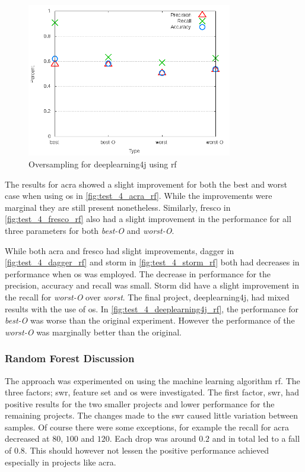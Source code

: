 \begin{figure}[!ht]
    \centering
        \includegraphics[width=0.8\textwidth]{images/rf/test_4/deeplearning4j_sample_range}
    \caption{Oversampling for deeplearning4j using \gls{rf}}
    \label{fig:test_4_deeplearning4j_rf}
\end{figure}

The results for acra showed a slight improvement for both the best and worst case when using \gls{os} in \autoref{fig:test_4_acra_rf}. While the improvements were marginal they are still present nonetheless. Similarly, fresco in \autoref{fig:test_4_fresco_rf} also had a slight improvement in the performance for all three parameters for both \textit{best-O} and \textit{worst-O}.

While both acra and fresco had slight improvements, dagger in \autoref{fig:test_4_dagger_rf} and storm in \autoref{fig:test_4_storm_rf} both had decreases in performance when \gls{os} was employed. The decrease in performance for the precision, accuracy and recall was small. Storm did have a slight improvement in the recall for \textit{worst-O} over \textit{worst}. The final project, deeplearning4j, had mixed results with the use of \gls{os}. In \autoref{fig:test_4_deeplearning4j_rf}, the performance for \textit{best-O} was worse than the original experiment. However the performance of the \textit{worst-O} was marginally better than the original.

\subsubsection{Random Forest Discussion}
\label{subsec:rf_discussion}

The approach was experimented on using the machine learning algorithm \gls{rf}. The three factors; \gls{swr}, feature set and \gls{os} were investigated. The first factor, \gls{swr}, had positive results for the two smaller projects and lower performance for the remaining projects. The changes made to the \gls{swr} caused little variation between samples. Of course there were some exceptions, for example the recall for acra decreased at $80$, $100$ and $120$. Each drop was around $0.2$ and in total led to a fall of $0.8$. This should however not lessen the positive performance achieved especially in projects like acra.

